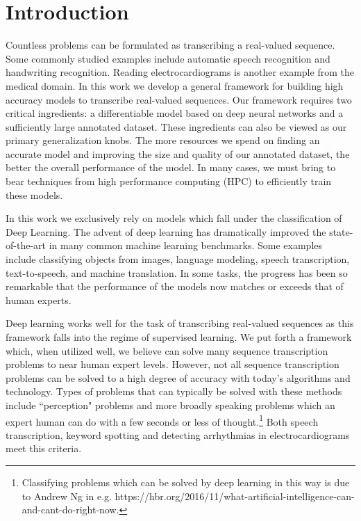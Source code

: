 \chapter{Introduction}

Countless problems can be formulated as transcribing a real-valued sequence.
Some commonly studied examples include automatic speech recognition and
handwriting recognition. Reading electrocardiograms is another example from the
medical domain. In this work we develop a general framework for building high
accuracy models to transcribe real-valued sequences. Our framework requires two
critical ingredients: a differentiable model based on deep neural networks and
a sufficiently large annotated dataset. These ingredients can also be viewed as
our primary generalization knobs. The more resources we spend on finding an
accurate model and improving the size and quality of our annotated dataset, the
better the overall performance of the model. In many cases, we must bring to
bear techniques from high performance computing (HPC) to efficiently train
these models.

In this work we exclusively rely on models which fall under the classification
of Deep Learning. The advent of deep learning has dramatically improved the
state-of-the-art in many common machine learning benchmarks. Some examples
include classifying objects from images, language modeling, speech
transcription, text-to-speech, and machine translation. In some tasks, the
progress has been so remarkable that the performance of the models now matches
or exceeds that of human experts.

Deep learning works well for the task of transcribing real-valued sequences as
this framework falls into the regime of supervised learning. We put forth a
framework which, when utilized well, we believe can solve many sequence
transcription problems to near human expert levels. However, not all sequence
transcription problems can be solved to a high degree of accuracy with today's
algorithms and technology. Types of problems that can typically be solved with
these methods include ``perception" problems and more broadly speaking problems
which an expert human can do with a few seconds or less of
thought.\footnote{Classifying problems which can be solved by deep learning in
this way is due to Andrew Ng in e.g.
https://hbr.org/2016/11/what-artificial-intelligence-can-and-cant-do-right-now.}
Both speech transcription, keyword spotting and detecting arrhythmias in
electrocardiograms meet this criteria.

